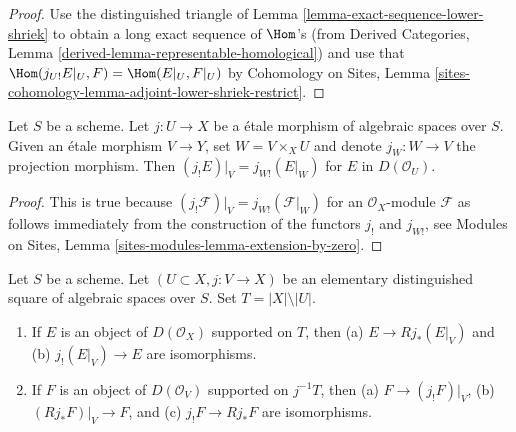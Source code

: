 \begin{proof}
Use the distinguished triangle of
Lemma \ref{lemma-exact-sequence-lower-shriek}
to obtain a long exact sequence of $\Hom$'s
(from Derived Categories, Lemma \ref{derived-lemma-representable-homological})
and use that $\Hom(j_{U!}E|_U, F) = \Hom(E|_U, F|_U)$
by Cohomology on Sites, Lemma
\ref{sites-cohomology-lemma-adjoint-lower-shriek-restrict}.
\end{proof}

\begin{lemma}
\label{lemma-restrict-lower-shriek}
Let $S$ be a scheme. Let $j : U \to X$ be a \'etale morphism of algebraic
spaces over $S$. Given an \'etale morphism $V \to Y$, set $W = V \times_X U$
and denote $j_W : W \to V$ the projection morphism. Then
$(j_!E)|_V = j_{W!}(E|_W)$ for $E$ in $D(\mathcal{O}_U)$.
\end{lemma}

\begin{proof}
This is true because
$(j_!\mathcal{F})|_V = j_{W!}(\mathcal{F}|_W)$
for an $\mathcal{O}_X$-module $\mathcal{F}$ as follows immediately 
from the construction of the functors $j_!$ and $j_{W!}$, see
Modules on Sites, Lemma \ref{sites-modules-lemma-extension-by-zero}.
\end{proof}

\begin{lemma}
\label{lemma-pushforward-with-support-in-open}
Let $S$ be a scheme. Let $(U \subset X, j : V \to X)$ be an elementary
distinguished square of algebraic spaces over $S$. Set
$T = |X| \setminus |U|$.
\begin{enumerate}
\item If $E$ is an object of $D(\mathcal{O}_X)$ supported on $T$, then
(a) $E \to Rj_*(E|_V)$ and (b) $j_!(E|_V) \to E$ are isomorphisms.
\item If $F$ is an object of $D(\mathcal{O}_V)$ supported on $j^{-1}T$, then
(a) $F \to (j_!F)|_V$, (b) $(Rj_*F)|_V \to F$, and (c)
$j_!F \to Rj_*F$ are isomorphisms.
\end{enumerate}
\end{lemma}

